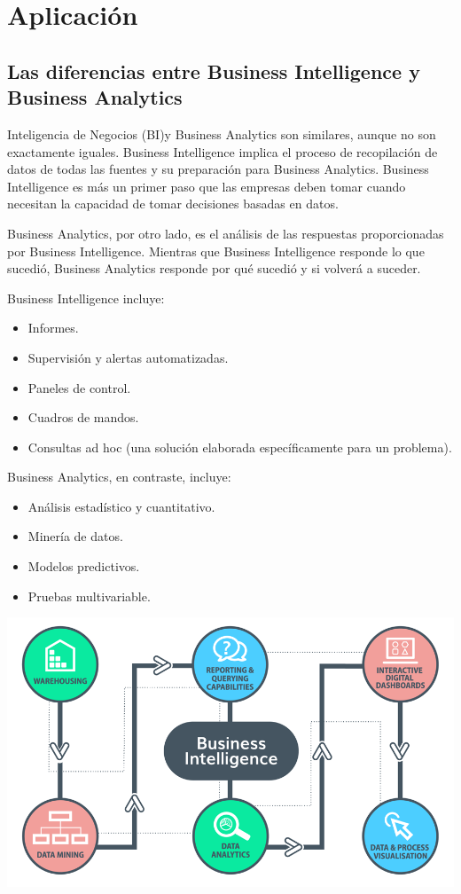 \section{Aplicación} 

\subsection{Las diferencias entre Business Intelligence y Business Analytics}

Inteligencia de Negocios (BI)y Business Analytics son similares, aunque no son exactamente iguales. Business Intelligence implica el proceso de recopilación de datos de todas las fuentes y su preparación para Business Analytics. Business Intelligence es más un primer paso que las empresas deben tomar cuando necesitan la capacidad de tomar decisiones basadas en datos.\newline

Business Analytics, por otro lado, es el análisis de las respuestas proporcionadas por Business Intelligence. Mientras que Business Intelligence responde lo que sucedió, Business Analytics responde por qué sucedió y si volverá a suceder.\newline

Business Intelligence incluye:

\begin{itemize}
\item Informes.
\item Supervisión y alertas automatizadas.
\item Paneles de control.
\item Cuadros de mandos.
\item Consultas ad hoc (una solución elaborada específicamente para un problema).\newline
\end{itemize}

Business Analytics, en contraste, incluye:

\begin{itemize}
\item Análisis estadístico y cuantitativo.
\item Minería de datos.
\item Modelos predictivos.
\item Pruebas multivariable.\newline
\end{itemize}

\begin{center}
\includegraphics[width=0.6\columnwidth]{images/bi/bi-t}\newline
\end{center}